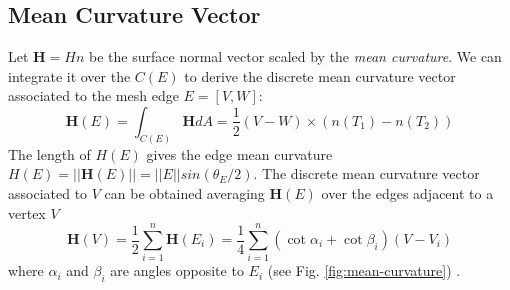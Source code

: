 \subsection{Mean Curvature Vector}
Let $\bm{H} = H n$ be the surface normal vector scaled by the \textit{mean curvature}. We can integrate it over the $C(E)$ to derive the discrete mean curvature vector associated to the mesh edge $E=[V, W]$:
$$ \bm{H}(E) = \int_{C(E)} \bm{H}dA = \frac{1}{2} (V-W) \times (n(T_1) - n(T_2))$$
The length of $H(E)$ gives the edge mean curvature $H(E) = ||\bm{H}(E) || = ||E|| sin(\theta_E/2)$. The discrete mean curvature vector associated to $V$ can be obtained averaging $\bm{H}(E)$ over the edges adjacent to a vertex $V$
$$\bm{H}(V) = \frac{1}{2} \sum_{i=1}^{n} \bm{H}(E_i) = \frac{1}{4}\sum_{i=1}^n (\cot \alpha_i + \cot \beta_i)(V - V_i)$$
where $\alpha_i$ and $\beta_i$ are angles opposite to $E_i$ (see Fig. \ref{fig:mean-curvature}) \cite{geometryprocessing}.
